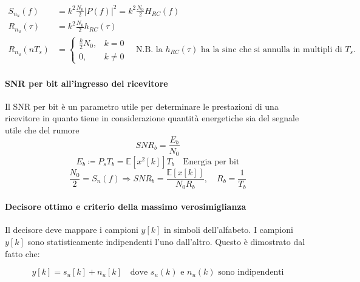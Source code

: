 \begin{enumerate}
          \begin{align*}
              S_{n_u}(f)    & = k^2 \frac{N_0}{2} |P(f)|^2 = k^2 \frac{N_0}{2} H_{RC}(f) \\
              R_{n_u}(\tau) & = k^2 \frac{N_0}{2} h_{RC}(\tau)                           \\
              R_{n_u}(nT_s) & = \begin{cases}
                                    \frac{k}{2} N_0, & k = 0    \\
                                    0,               & k \neq 0
                                \end{cases} \quad
              \text{N.B. la $h_{RC}(\tau)$ ha la sinc che si annulla in multipli di $T_s$.}
          \end{align*}

\end{enumerate}


\paragraph{SNR per bit all'ingresso del ricevitore}

Il SNR per bit è un parametro utile per determinare le prestazioni di una ricevitore in quanto tiene in considerazione quantità energetiche sia del segnale utile che del rumore
\[
    SNR_b = \frac{E_b}{N_0}
\]
\[
    E_b \coloneqq P_s T_b = \mathbb{E}\left[x^2[k]\right]T_b \quad \text{Energia per bit} \]
\[
    \frac{N_0}{2} = S_n(f)
    \Rightarrow SNR_b = \frac{\mathbb{E}\left[ x[k]\right]}{N_0 R_b}, \quad R_b = \frac{1}{T_b}
\]

\paragraph{Decisore ottimo e criterio della massimo verosimiglianza}

Il decisore deve mappare i campioni $y[k]$ in simboli dell'alfabeto. I campioni $y[k]$ sono statisticamente indipendenti l'uno dall'altro. Questo è dimostrato dal fatto che:

\[
    y[k] = s_u[k] + n_u[k]
    \quad
    \text{dove } s_u(k) \text{ e } n_u(k) \text{ sono indipendenti}
\]


\begin{center}
\end{center}

